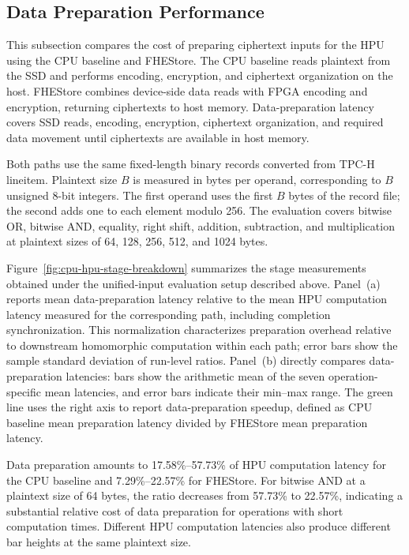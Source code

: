 \documentclass[sigconf,anonymous,balance=false]{acmart}
\newcommand{\bodypar}{\par\vskip 0pt plus 6pt\relax}
\begin{document}
\subsection{Data Preparation Performance}
\label{sec:peripheral-overhead}
This subsection compares the cost of preparing ciphertext inputs for the HPU using the CPU baseline and FHEStore. The CPU baseline reads plaintext from the SSD and performs encoding, encryption, and ciphertext organization on the host. FHEStore combines device-side data reads with FPGA encoding and encryption, returning ciphertexts to host memory. Data-preparation latency covers SSD reads, encoding, encryption, ciphertext organization, and required data movement until ciphertexts are available in host memory.
\bodypar

Both paths use the same fixed-length binary records converted from TPC-H lineitem. Plaintext size $B$ is measured in bytes per operand, corresponding to $B$ unsigned 8-bit integers. The first operand uses the first $B$ bytes of the record file; the second adds one to each element modulo 256. The evaluation covers bitwise OR, bitwise AND, equality, right shift, addition, subtraction, and multiplication at plaintext sizes of 64, 128, 256, 512, and 1024 bytes.
\bodypar

Figure~\ref{fig:cpu-hpu-stage-breakdown} summarizes the stage measurements obtained under the unified-input evaluation setup described above. Panel~(a) reports mean data-preparation latency relative to the mean HPU computation latency measured for the corresponding path, including completion synchronization. This normalization characterizes preparation overhead relative to downstream homomorphic computation within each path; error bars show the sample standard deviation of run-level ratios. Panel~(b) directly compares data-preparation latencies: bars show the arithmetic mean of the seven operation-specific mean latencies, and error bars indicate their min--max range. The green line uses the right axis to report data-preparation speedup, defined as CPU baseline mean preparation latency divided by FHEStore mean preparation latency.
\bodypar

Data preparation amounts to 17.58\%--57.73\% of HPU computation latency for the CPU baseline and 7.29\%--22.57\% for FHEStore. For bitwise AND at a plaintext size of 64 bytes, the ratio decreases from 57.73\% to 22.57\%, indicating a substantial relative cost of data preparation for operations with short computation times. Different HPU computation latencies also produce different bar heights at the same plaintext size.
\bodypar
\end{document}
